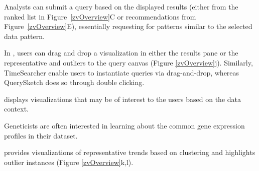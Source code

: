  Analysts can submit a query based on the displayed results (either from the ranked list in Figure~\ref{zvOverview}C or recommendations from Figure~\ref{zvOverview}E), essentially requesting for patterns similar to the selected data pattern.
\problemlist
  \item
  \item
\enumend
\featurelist
  \item In \zvpp, users can drag and drop a visualization in either the results pane or the representative and outliers to the query canvas (Figure \ref{zvOverview}j). Similarly, TimeSearcher enable users to instantiate queries via drag-and-drop, whereas QuerySketch does so through double clicking.
  \item
\enumend
 displays visualizations that may be of interest to the users based on the data context.
\problemlist
  \item Geneticists are often interested in learning about the common gene expression profiles in their dataset.
\enumend
\featurelist
  \item \zvpp provides visualizations of representative trends based on clustering and highlights outlier instances (Figure \ref{zvOverview}k,l).%
\enumend
